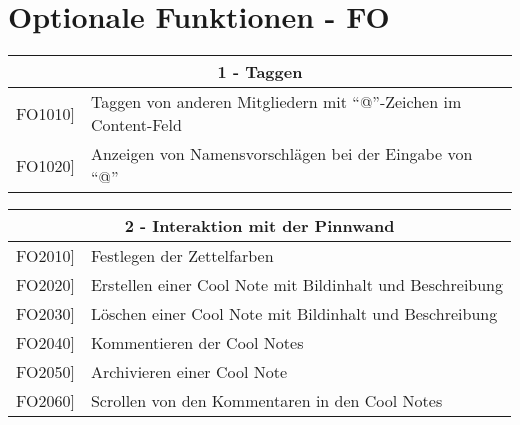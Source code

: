 \documentclass[a4paper]{scrreprt}
\begin{document}
    		\vspace{1cm}
    		
    		\section{Optionale Funktionen - FO}
    		
    		\begin{table}[h!]
    			\centering
    			\label{my-label}
    			\begin{tabular}{p{2cm}p{12cm}}
    				
    				\multicolumn{2}{c}{\textbf{1 - Taggen}} \\ \hline
    				\centering{[}FO1010{]} & Taggen von anderen Mitgliedern mit “@”-Zeichen im Content-Feld\\
    				\centering{[}FO1020{]}& Anzeigen von Namensvorschlägen bei der Eingabe von “@”                               \\
    				\hline
    			\end{tabular}
    		\end{table}
    		
    		\vspace{5mm}
    		
    		\begin{table}[h!]
    			\centering
    			\label{my-label}
    			\begin{tabular}{p{2cm}p{12cm}}
    				
    				\multicolumn{2}{c}{\textbf{2 - Interaktion mit der Pinnwand}} \\ \hline
    				\centering{[}FO2010{]} & Festlegen der Zettelfarben\\
    				\centering{[}FO2020{]}& Erstellen einer Cool Note mit Bildinhalt und Beschreibung                              \\
    				\centering{[}FO2030{]}& Löschen einer Cool Note mit Bildinhalt und Beschreibung\\ 
    				\centering{[}FO2040{]}& Kommentieren der Cool Notes\\ 
    				\centering{[}FO2050{]}& Archivieren einer Cool Note\\ 
    				\centering{[}FO2060{]}& Scrollen von den Kommentaren in den Cool Notes\\ 
    				\hline
    			\end{tabular}
    		\end{table}
    		
    		\vspace{5mm}
    		
\end{document}
